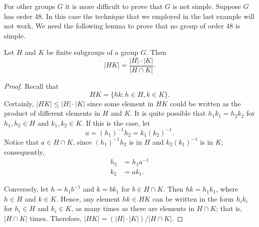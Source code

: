  

 
 
For other groups $G$ it is more difficult to prove that $G$ is not
simple. Suppose $G$ has order 48. In this case the technique that we
employed in the last example will not work.  We need the following
lemma to prove that no group of order 48 is simple.  
 
 
\begin{lemma}\label{sylow:hk_subgroup_lemma}
Let $H$ and $K$ be finite subgroups of a group $G$. Then
\[
|HK| = \frac{|H| \cdot |K|}{|H \cap K|}.
\]
\end{lemma}
 
 
\begin{proof}
Recall that
\[
HK = \{ hk : h \in H, k \in K \}.
\]
Certainly, $|HK| \leq |H| \cdot |K|$ since some element in $HK$
could be written as the product of different elements in $H$ and $K$.
It is quite possible that $h_1 k_1 = h_2 k_2$ for $h_1, h_2 \in H$ and
$k_1, k_2 \in K$.  If this is the case, let
\[
a = (h_1)^{-1} h_2 = k_1 (k_2)^{-1}.
\]
Notice that $a \in H \cap K$, since $(h_1)^{-1} h_2$ is in $H$ and
$k_2 (k_1)^{-1}$ is in $K$; consequently, 
\begin{align*}
h_2 & =  h_1 a^{-1} \\
k_2 & =  a k_1.
\end{align*}
 
 
Conversely, let $h = h_1 b^{-1}$ and $k = b k_1$ for $b \in  H
\cap K$. Then $h k = h_1 k_1$, where $h \in H$ and $k \in K$. Hence,
any element $hk \in HK$ can be written in the form $h_i k_i$ for $h_i
\in H$ and $k_i \in K$, as many times as there are elements in $H
\cap K$; that is, $|H \cap K|$ times. Therefore, $|HK| = (|H| \cdot
|K|)/|H \cap K|$. 
\mbox{\hspace*{1in}}
\end{proof}
 
 
 
